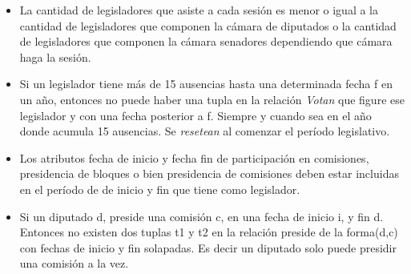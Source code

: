 \begin{itemize}
	\item La cantidad de legisladores que asiste a cada sesi\'on es menor o igual a la cantidad de legisladores que componen la c\'amara de diputados o la cantidad de legisladores que componen la c\'amara senadores dependiendo que c\'amara haga la sesi\'on.
	
	\item Si un legislador tiene m\'as de 15 ausencias hasta una determinada fecha f en un a\~no, entonces no puede haber una tupla en la relaci\'on \textit{Votan} que figure ese legislador y con una fecha posterior a f. Siempre y cuando sea en el a\~no donde acumula 15 ausencias. Se \textit{resetean} al comenzar el per\'iodo legislativo.
	
	\item Los atributos fecha de inicio y fecha fin de participaci\'on en comisiones, presidencia de bloques o bien presidencia de comisiones deben estar incluidas en el per\'iodo de de inicio y fin que tiene como legislador.
	
	\item Si un diputado d, preside una comisi\'on c, en una fecha de inicio i, y fin d. Entonces no existen dos tuplas t1 y t2 en la relaci\'on preside de la forma(d,c) con fechas de inicio y fin solapadas. Es decir un diputado solo puede presidir una comisi\'on a la vez.


\end{itemize}	